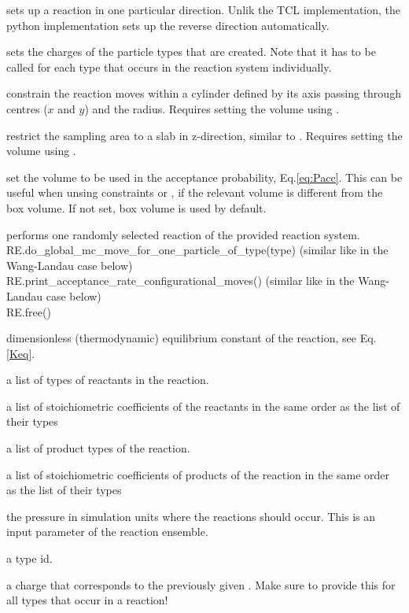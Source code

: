  sets up a reaction in one particular direction. Unlik the TCL
implementation, the python implementation sets up the reverse direction
automatically.

 sets the charges of the particle types that are created. Note that
it has to be called for each type that occurs in the reaction system
individually.

 constrain the reaction moves within a cylinder defined by its axis passing through centres ($x$ and $y$) and the radius. 
Requires setting the volume using .

 restrict the sampling area to a slab in z-direction, similar to .
Requires setting the volume using .

 set the volume to be used in the acceptance probability,
Eq.\ref{eq:Pacc}. This can be useful when unsing constraints  or
, if the relevant volume is different from the box volume. If not
set, box volume is used by default.

 performs one randomly selected reaction of the provided reaction system.
	  RE.do_global_mc_move_for_one_particle_of_type(type) (similar like in the Wang-Landau case below) \\
	 RE.print_acceptance_rate_configurational_moves() (similar like in the Wang-Landau case below) \\
	 RE.free() 

  \begin{arguments}
  \item[\var{K}] dimensionless (thermodynamic) equilibrium constant of the reaction, see Eq.\ref{Keq}. 
\item[\var{list\_reactant\_types}] a list of types of reactants in the reaction.
\item[\var{list\_reactant\_coefficients}] a list of stoichiometric coefficients of the reactants 
	in the same order as the list of their types
\item[\var{list\_product\_types}] a list of product types of the reaction.
\item[\var{list\_product\_coefficients}] a list of stoichiometric coefficients of products of the reaction
	in the same order as the list of their types
\item[\var{desired\_pressure\_at\_which\_reactions\_occur}] the pressure in simulation units where the reactions should occur. This is an input parameter of the reaction ensemble.
\item[\var{type}] a type id.
\item[\var{charge}] a charge that corresponds to the previously given . Make sure to provide this for all types that occur in a reaction!
  \end{arguments}


